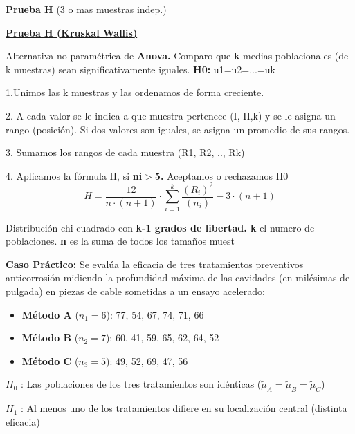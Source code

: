 \documentclass[12pt,a4paper]{article}
\begin{document}
\begin{center}
{\fontsize{21}{25}\selectfont\bfseries Prueba H} {\fontsize{19}{23}\selectfont (3 o mas muestras indep.)}
\end{center}

\begin{center}
\begin{minipage}{0.87\textwidth}
\begin{center}
{\fontsize{19}{23}\selectfont\bfseries\uline{Prueba H (Kruskal Wallis)}}
\end{center}

Alternativa no paramétrica de \textbf{Anova.} Comparo que \textbf{k} medias poblacionales (de k muestras) sean significativamente iguales. \textbf{H0:} u1=u2=...=uk

1.Unimos las k muestras y las ordenamos de forma creciente.

2. A cada valor se le indica a que muestra pertenece (I, II,k) y se le asigna un rango (posición). Si dos valores son iguales, se asigna un promedio de sus rangos.

3. Sumamos los rangos de cada muestra (R1, R2, .., Rk)

4. Aplicamos la fórmula H, si \textbf{ni$>$5.} Aceptamos o rechazamos H0
\[
H = \frac{12}{n\cdot(n+1)}\cdot \sum_{i=1}^{k} \frac{\left(R_i\right)^2}{\left(n_i\right)} - 3\cdot(n+1)
\]

Distribución chi cuadrado con \textbf{k-1 grados de libertad. k} el numero de poblaciones. \textbf{n} es la suma de todos los tamaños muest
\end{minipage}
\end{center}

\begin{minipage}[t]{0.615\textwidth}
\vspace{0pt}
\textbf{Caso Práctico:} Se evalúa la eficacia de tres tratamientos preventivos anticorrosión midiendo la profundidad máxima de las cavidades (en milésimas de pulgada) en piezas de cable sometidas a un ensayo acelerado:

\begin{itemize}[leftmargin=20pt,itemsep=20pt,topsep=14pt,parsep=0pt]
  \item \textbf{Método A} ($n_1 = 6$): 77, 54, 67, 74, 71, 66
  \item \textbf{Método B} ($n_2 = 7$): 60, 41, 59, 65, 62, 64, 52
  \item \textbf{Método C} ($n_3 = 5$): 49, 52, 69, 47, 56
\end{itemize}
\end{minipage}\hfill
\begin{minipage}[t]{0.355\textwidth}
\vspace{34pt}
{\footnotesize
$H_0$ : Las poblaciones de los tres tratamientos son idénticas ($\tilde{\mu}_A = \tilde{\mu}_B = \tilde{\mu}_C$)

\vspace{4pt}
$H_1$ : Al menos uno de los tratamientos difiere en su localización central (distinta eficacia)
}
\end{minipage}
\end{document}

